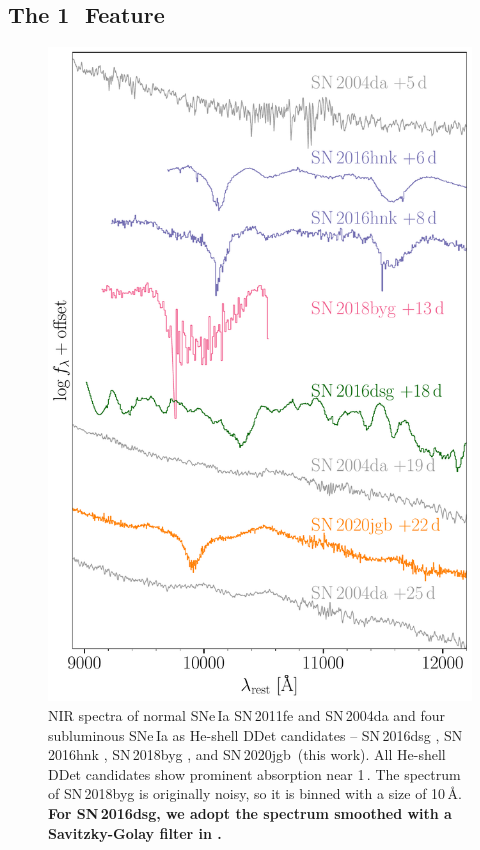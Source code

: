 \documentclass[twocolumn]{aastex631}
\newcommand{\sn}{SN\,2020jgb}
\newcommand{\revise}[1]{\textbf{#1}}
\begin{document}
\subsection{The 1\,\micron\ Feature} \label{sec:1um}
\begin{figure}
    \centering
    \includegraphics[width=\linewidth]{NIR_spec_comp.pdf}
    \caption{NIR spectra of normal SNe\,Ia SN\,2011fe \citep{Mazzali_2014} and SN\,2004da \citep{Marion2009_NIR} and four subluminous SNe\,Ia  as He-shell DDet candidates -- SN\,2016dsg \citep{Dong_16dsg_2022}, SN\,2016hnk \citep{galbany_16hnk_2019}, SN\,2018byg \citep{de_18byg_2019}, and \sn\ (this work). All He-shell DDet candidates show prominent absorption near 1\,\micron. The spectrum of SN\,2018byg is originally noisy, so it is binned with a size of 10\,\AA. \revise{For SN\,2016dsg, we adopt the spectrum smoothed with a Savitzky-Golay filter in \citet{Dong_16dsg_2022}.}}
    \label{fig:NIR_comp}
\end{figure}
\end{document}
